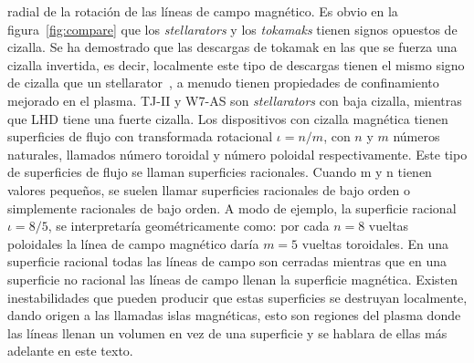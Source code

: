 radial de la rotación de las líneas de campo magnético. Es obvio en la figura~\ref{fig:compare} que los \textit{stellarators} y los \textit{tokamaks} tienen signos opuestos de cizalla. Se
ha demostrado que las descargas de tokamak en las que se fuerza una cizalla
invertida, es decir, localmente este tipo de descargas tienen el mismo signo
de cizalla que un stellarator~\cite{PhysRevLett.75.4417}, a menudo tienen propiedades
de confinamiento mejorado en el plasma. TJ-II y W7-AS son \textit{stellarators}
con baja cizalla, mientras que LHD tiene una fuerte cizalla. Los
dispositivos con cizalla magnética tienen superficies de flujo con transformada
rotacional $\iota=n/m$, con $n$ y $m$ números naturales, llamados número toroidal
y número poloidal respectivamente. Este tipo de superficies de flujo se llaman
superficies racionales. Cuando m y n tienen valores pequeños, se
suelen llamar superficies racionales de bajo orden o simplemente racionales
de bajo orden. A modo de ejemplo, la superficie racional $\iota=8/5$,
se interpretaría geométricamente como: por cada $n=8$ vueltas poloidales la
línea de campo magnético daría $m=5$ vueltas toroidales. En una superficie
racional todas las líneas de campo son cerradas mientras que en una superficie
no racional las líneas de campo llenan la superficie magnética.
Existen inestabilidades que pueden producir que estas superficies
se destruyan localmente, dando origen a las llamadas islas magnéticas, esto son regiones del plasma donde las líneas llenan un volumen en vez de una
superficie y se hablara de ellas más adelante en este texto.
